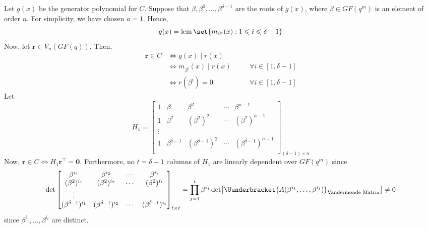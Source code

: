\begin{Proof}{}{}
    Let $ g(x) $ be
    the generator polynomial for $ C $. Suppose that
    $ \beta,\beta^2,\ldots ,\beta^{\delta-1} $
    are the roots of $ g(x) $, where $ \beta\in GF(q^m) $
    is an element of order $ n $. For simplicity, we have chosen
    $ a=1 $.
    Hence,
    \[ g(x)=\lcm \set{m_{\beta^i}(x):1\leqslant i\leqslant \delta-1} \]
    Now, let $ \symbf{r}\in V_n(GF(q)) $. Then,
    \[ \begin{aligned}
            \symbf{r}\in C
             & \iff g(x)\mid r(x)                                              \\
             & \iff m_{\beta^i}(x)\mid r(x) & \quad & \forall i\in[1,\delta-1] \\
             & \iff r(\beta^i)=0            & \quad & \forall i\in[1,\delta-1]
        \end{aligned} \]
    Let
    \[ H_1=
        \begin{bmatrix}
            1 & \beta            & \beta^2              & \cdots & \beta^{n-1}              \\
            1 & \beta^2          & (\beta^2)^2          & \cdots & (\beta^2)^{n-1}          \\
            \vdots                                                                          \\
            1 & \beta^{\delta-1} & (\beta^{\delta-1})^2 & \cdots & (\beta^{\delta-1})^{n-1} \\
        \end{bmatrix}_{(\delta-1)\times n} \]
    Now, $ \symbf{r}\in C\iff H_1\symbf{r}^\top=\symbf{0} $. Furthermore, no $ t=\delta-1 $
    columns of $ H_1 $ are linearly dependent over $ GF(q^m) $
    since
    \[ \det
        \begin{bmatrix}
            \beta^{i_1}              & \beta^{i_2}              & \cdots & \beta^{i_t}              \\
            (\beta^2)^{i_1}          & (\beta^2)^{i_2}          & \cdots & (\beta^2)^{i_t}          \\
            \vdots                                                                                  \\
            (\beta^{\delta-1})^{i_1} & (\beta^{\delta-1})^{i_2} & \cdots & (\beta^{\delta-1})^{i_t}
        \end{bmatrix}_{t\times t}=\prod_{j=1}^t\beta^{i_j}\det\bigl[\Uunderbracket{A(\beta^{i_1},\ldots,\beta^{i_t})}_{\text{Vandermonde Matrix}}\bigr]\neq 0 \]
    since $ \beta^{i_1},\ldots ,\beta^{i_t} $ are distinct.


\end{Proof}
